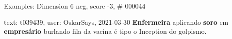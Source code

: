 \begin{frame}{Examples: Dimension 6 neg, score -3, \# 000044}
\footnotesize
\begin{alertblock}{text: t039439, user: OskarSays, 2021-03-30}
\textbf{Enfermeira} aplicando \textbf{soro} em \textbf{empresário} burlando 
fila da vacina é tipo o Inception do golpismo. 
\end{alertblock}
\end{frame}
